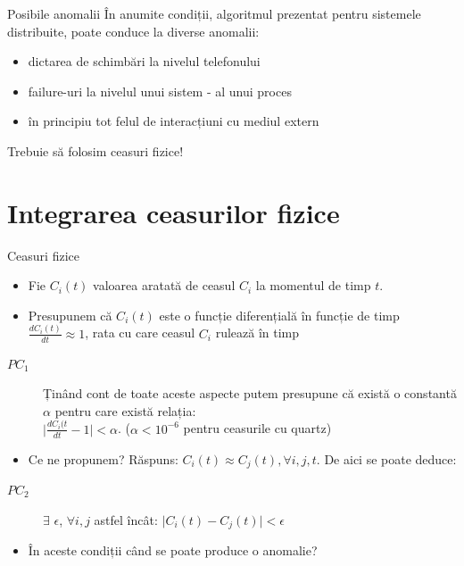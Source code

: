 \documentclass[9pt]{beamer}
\begin{document}
\begin{frame}{Posibile anomalii}
\Large{În anumite condiții, algoritmul prezentat pentru sistemele distribuite, poate conduce la diverse anomalii:}
    \begin{itemize}
        \vskip5pt
        \item dictarea de schimbări la nivelul telefonului
        \vskip5pt
        \item failure-uri la nivelul unui sistem - al unui proces
        \vskip5pt
        \item în principiu tot felul de interacțiuni cu mediul extern
    \end{itemize}
\vskip10pt
\centering
\huge{\rm{Trebuie să folosim ceasuri fizice!}}
\end{frame}

\section[]{Integrarea ceasurilor fizice}

\begin{frame}{Ceasuri fizice}
\begin{itemize}
    \item Fie $C_i(t)$ valoarea aratată de ceasul $C_i$ la momentul de timp $t$.
    \vskip5pt
    \item Presupunem că $C_i(t)$ este o funcție diferențială în funcție de timp $\frac{dC_i(t)}{dt}\approx1$, rata cu care ceasul $C_i$ rulează în timp
    \vskip10pt
\end{itemize}
\begin{description}
    \item[$PC_1$] Ținând cont de toate aceste aspecte putem presupune că există o constantă $\alpha$ pentru care există relația:\\
    $\lvert\frac{dC_i(t}{dt}-1\rvert<\alpha$. ($\alpha<10^{-6}$ pentru ceasurile cu quartz)
\end{description}
\begin{itemize}
    \item Ce ne propunem? Răspuns: $C_i(t)\approx C_j(t),\forall i,j,t$. De aici se poate deduce:
    \vskip10pt
\end{itemize}
\begin{description}
    \item[$PC_2$] $\exists$ $\epsilon$, $\forall i,j$ astfel încât: $\lvert C_i(t)-C_j(t)\rvert<\epsilon$
\end{description}
\begin{itemize}
    \item În aceste condiții când se poate produce o anomalie?
\end{itemize}
\end{frame}
\end{document}
